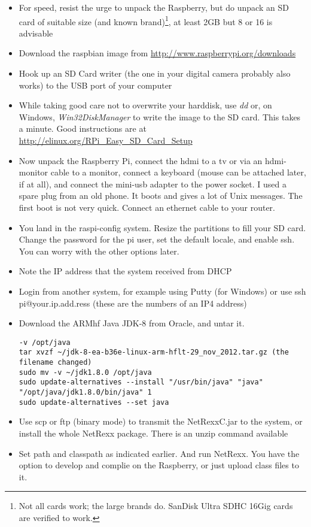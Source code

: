 \begin{itemize}
\item For speed, resist the urge to unpack the Raspberry, but do unpack an SD card of suitable size (and known brand)\footnote{Not all cards work; the large brands do. SanDisk Ultra SDHC 16Gig cards are verified to work.}, at least 2GB but 8 or 16 is advisable
\item Download the raspbian image from \url{http://www.raspberrypi.org/downloads}
\item Hook up an SD Card writer (the one in your digital camera probably also works) to the USB port of your computer
\item While taking good care not to overwrite your harddisk, use \emph{dd} or, on Windows, \emph{Win32DiskManager} to write the image to the SD card. This takes a minute. Good instructions are at \url{http://elinux.org/RPi_Easy_SD_Card_Setup}
\item Now unpack the Raspberry Pi, connect the hdmi to a tv or via an hdmi-monitor cable to a monitor, connect a keyboard (mouse can be attached later, if at all), and connect the mini-usb adapter to the power socket. I used a spare plug from an old phone. It boots and gives a lot of Unix messages. The first boot is not very quick. Connect an ethernet cable to your router.
\item You land in the raspi-config system. Resize the partitions to fill your SD card. Change the password for the pi user, set the default locale, and enable ssh. You can worry with the other options later.
\item Note the IP address that the system received from DHCP
\item Login from another system, for example using Putty (for Windows) or use ssh pi@your.ip.add.ress (these are the numbers of an IP4 address)
\item Download the ARMhf Java JDK-8 from Oracle, and untar it.
\begin{verbatim}
-v /opt/java 
tar xvzf ~/jdk-8-ea-b36e-linux-arm-hflt-29_nov_2012.tar.gz (the filename changed) 
sudo mv -v ~/jdk1.8.0 /opt/java 
sudo update-alternatives --install "/usr/bin/java" "java" "/opt/java/jdk1.8.0/bin/java" 1 
sudo update-alternatives --set java 
\end{verbatim}
\item Use scp or ftp (binary mode) to transmit the NetRexxC.jar to the system, or install the whole NetRexx package. There is an unzip command available
\item Set path and classpath as indicated earlier. And run NetRexx. You have the option to develop and complie on the Raspberry, or just upload class files to it.
\end{itemize}